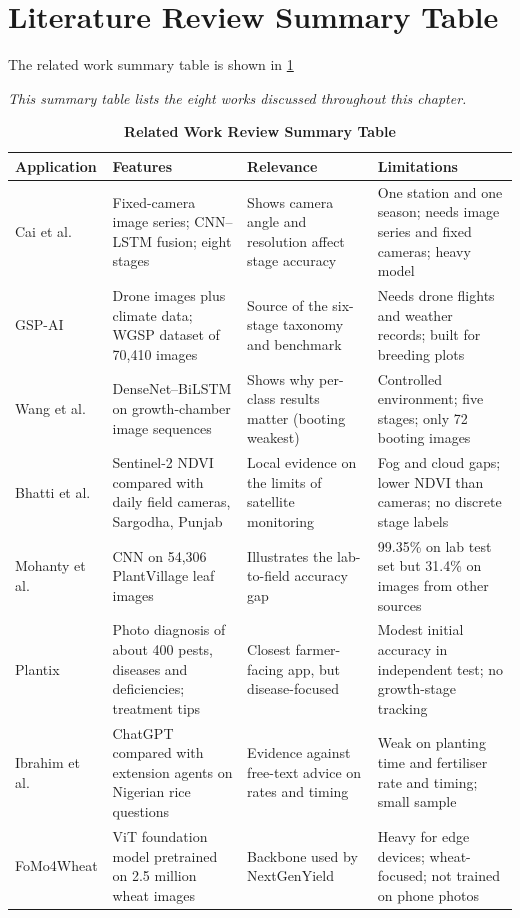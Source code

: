 \documentclass{FastFyp}
\begin{document}
\section{Literature Review Summary Table}
The related work summary table is shown in \ref{tab:1}
\begin{table}[!h]
\centering
\caption{\textbf{Related Work Review Summary Table} }\textit{This summary table lists the eight works discussed throughout this chapter.}
\newline

\begin{tabular}{|p{2.5cm}|p{2.5cm}|p{4cm}|p{5cm}|}
\hline
    \textbf{Application} & \textbf{Features} & \textbf{Relevance} & \textbf{Limitations} \\
\hline
Cai et al. \cite{ref:Cai:2024} & Fixed-camera image series; CNN--LSTM fusion; eight stages & Shows camera angle and resolution affect stage accuracy & One station and one season; needs image series and fixed cameras; heavy model \\
\hline
GSP-AI \cite{ref:Shen:2024} & Drone images plus climate data; WGSP dataset of 70,410 images & Source of the six-stage taxonomy and benchmark & Needs drone flights and weather records; built for breeding plots \\
\hline
Wang et al. \cite{ref:Wang:2025} & DenseNet--BiLSTM on growth-chamber image sequences & Shows why per-class results matter (booting weakest) & Controlled environment; five stages; only 72 booting images \\
\hline
Bhatti et al. \cite{ref:Bhatti:2024} & Sentinel-2 NDVI compared with daily field cameras, Sargodha, Punjab & Local evidence on the limits of satellite monitoring & Fog and cloud gaps; lower NDVI than cameras; no discrete stage labels \\
\hline
Mohanty et al. \cite{ref:Mohanty:2016} & CNN on 54,306 PlantVillage leaf images & Illustrates the lab-to-field accuracy gap & 99.35\% on lab test set but 31.4\% on images from other sources \\
\hline
Plantix \cite{ref:CABI:2020} & Photo diagnosis of about 400 pests, diseases and deficiencies; treatment tips & Closest farmer-facing app, but disease-focused & Modest initial accuracy in independent test; no growth-stage tracking \\
\hline
Ibrahim et al. \cite{ref:Ibrahim:2024} & ChatGPT compared with extension agents on Nigerian rice questions & Evidence against free-text advice on rates and timing & Weak on planting time and fertiliser rate and timing; small sample \\
\hline
FoMo4Wheat \cite{ref:Han:2025} & ViT foundation model pretrained on 2.5 million wheat images & Backbone used by NextGenYield & Heavy for edge devices; wheat-focused; not trained on phone photos \\
\hline
\end{tabular}
\label{tab:1}
\end{table}
\end{document}
